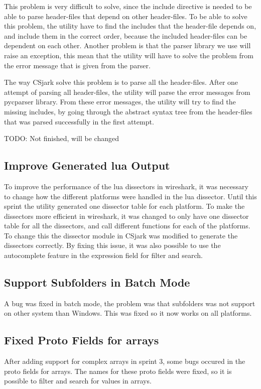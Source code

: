 This problem is very difficult to solve, since the include directive is needed 
to be able to parse \gls{header}-files that depend on other \gls{header}-files. To be able 
to solve this problem, the \gls{utility} have to find the includes that the 
\gls{header}-file depends on, and include them in the correct order, because the 
included \gls{header}-files can be dependent on each other. Another problem is 
that the parser library we use will raise an exception, this mean that the 
utility will have to solve the problem from the error message that is given 
from the parser.

The way CSjark solve this problem is to parse all the header-files. After one 
attempt of parsing all header-files, the utility will parse the error messages 
from pycparser library. From these error messages, the utility will try to 
find the missing includes, by going through the abstract syntax tree from the 
header-files that was parsed successfully in the first attempt. 

TODO: Not finished, will be changed

\subsection{Improve Generated \Gls{lua} Output}
To improve the performance of the \Gls{lua} \glspl{dissector} in \Gls{wireshark}, it was 
necessary to change how the different platforms were handled in the \Gls{lua} 
\gls{dissector}. Until this sprint the \gls{utility} generated one \gls{dissector} table for 
each platform. To make the \glspl{dissector} more efficient in \Gls{wireshark}, it was 
changed to only have one \gls{dissector} table for all the \glspl{dissector}, and call 
different functions for each of the platforms. To change this the \gls{dissector} 
module in CSjark was modified to generate the \glspl{dissector} correctly. By fixing 
this issue, it was also possible to use the autocomplete feature in the 
expression field for filter and search.

\subsection{Support Subfolders in Batch Mode}
A bug was fixed in batch mode, the problem was that subfolders was not support 
on other system than Windows. This was fixed so it now works on all platforms.

\subsection{Fixed Proto Fields for \Glspl{array}}
After adding support for complex \glspl{array} in sprint 3, some bugs occured in the 
proto fields for \glspl{array}. The names for these proto fields were fixed, so it is 
possible to filter and search for values in \glspl{array}. 

